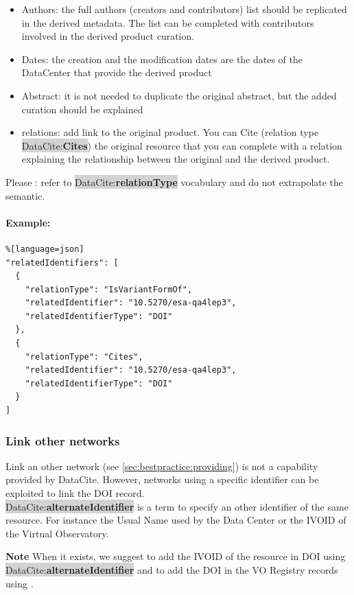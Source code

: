 \documentclass[11pt,a4paper]{ivoa}
\newcommand{\dataciteterm}[1]{\colorbox{lightgray}{DataCite:\textbf{#1}}}
\newcommand{\important}[1]{
	\begin{bigdescription}
		\item \color{ivoacolor}\textbf{Note} #1
	\end{bigdescription}
}
\begin{document}
\begin{itemize}
\item Authors: the full authors (creators and contributors) list should be replicated in the derived metadata. The list can be completed with contributors involved in the derived product curation.
\item Dates: the creation and the modification dates are the dates of the DataCenter that provide the derived product
\item Abstract: it is not needed to duplicate the original abstract, but the added curation should be explained
\item relations: add link to the original product. 
You can Cite (relation type \dataciteterm{Cites}) the original resource that you can complete with a relation explaining the relationship between the original and the derived product.
\end{itemize}

Please : refer to \dataciteterm{relationType} vocabulary and do not extrapolate the semantic.



\paragraph{Example:}
\begin{lstlisting}%[language=json]
"relatedIdentifiers": [
  {
    "relationType": "IsVariantFormOf",
    "relatedIdentifier": "10.5270/esa-qa4lep3",
    "relatedIdentifierType": "DOI"
  },
  {
    "relationType": "Cites",
    "relatedIdentifier": "10.5270/esa-qa4lep3",
    "relatedIdentifierType": "DOI"
  }
]
\end{lstlisting}

\subsubsection{Link other networks}
\label{sec:altidentifier}
Link an other network (see \ref{sec:bestpractice:providing}) is not a capability provided by DataCite.
However, networks using a specific identifier can be exploited to link the DOI record.\\
\dataciteterm{alternateIdentifier} is a term to specify an other identifier of the same resource. For instance the Usual Name used by the Data Center or the IVOID of the Virtual Observatory.

\important{When it exists, we suggest to add the IVOID of the resource in DOI using \dataciteterm{alternateIdentifier} and to add the DOI in the VO Registry records using \vorent{altIdentifier}.}
\end{document}
